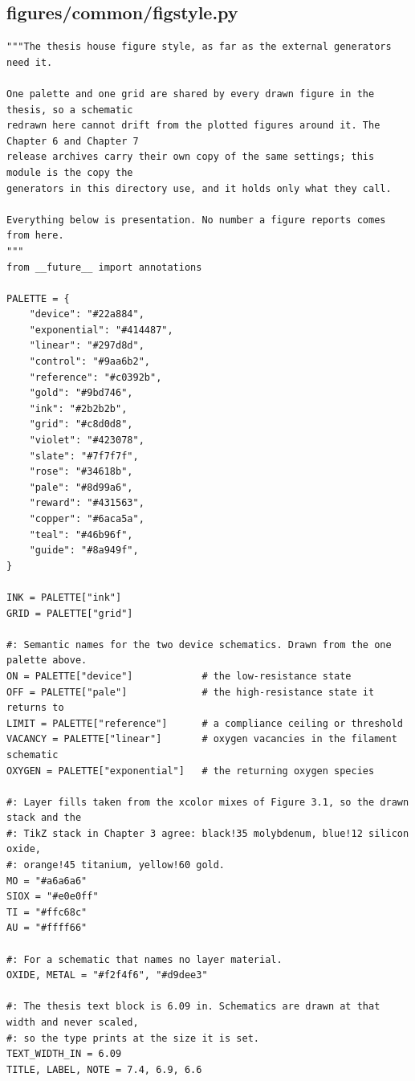 \documentclass[a4paper,10pt]{article}
\begin{document}
\subsection{figures/common/figstyle.py}
\begin{Verbatim}
"""The thesis house figure style, as far as the external generators need it.

One palette and one grid are shared by every drawn figure in the thesis, so a schematic
redrawn here cannot drift from the plotted figures around it. The Chapter 6 and Chapter 7
release archives carry their own copy of the same settings; this module is the copy the
generators in this directory use, and it holds only what they call.

Everything below is presentation. No number a figure reports comes from here.
"""
from __future__ import annotations

PALETTE = {
    "device": "#22a884",
    "exponential": "#414487",
    "linear": "#297d8d",
    "control": "#9aa6b2",
    "reference": "#c0392b",
    "gold": "#9bd746",
    "ink": "#2b2b2b",
    "grid": "#c8d0d8",
    "violet": "#423078",
    "slate": "#7f7f7f",
    "rose": "#34618b",
    "pale": "#8d99a6",
    "reward": "#431563",
    "copper": "#6aca5a",
    "teal": "#46b96f",
    "guide": "#8a949f",
}

INK = PALETTE["ink"]
GRID = PALETTE["grid"]

#: Semantic names for the two device schematics. Drawn from the one palette above.
ON = PALETTE["device"]            # the low-resistance state
OFF = PALETTE["pale"]             # the high-resistance state it returns to
LIMIT = PALETTE["reference"]      # a compliance ceiling or threshold
VACANCY = PALETTE["linear"]       # oxygen vacancies in the filament schematic
OXYGEN = PALETTE["exponential"]   # the returning oxygen species

#: Layer fills taken from the xcolor mixes of Figure 3.1, so the drawn stack and the
#: TikZ stack in Chapter 3 agree: black!35 molybdenum, blue!12 silicon oxide,
#: orange!45 titanium, yellow!60 gold.
MO = "#a6a6a6"
SIOX = "#e0e0ff"
TI = "#ffc68c"
AU = "#ffff66"

#: For a schematic that names no layer material.
OXIDE, METAL = "#f2f4f6", "#d9dee3"

#: The thesis text block is 6.09 in. Schematics are drawn at that width and never scaled,
#: so the type prints at the size it is set.
TEXT_WIDTH_IN = 6.09
TITLE, LABEL, NOTE = 7.4, 6.9, 6.6



\end{Verbatim}
\end{document}
